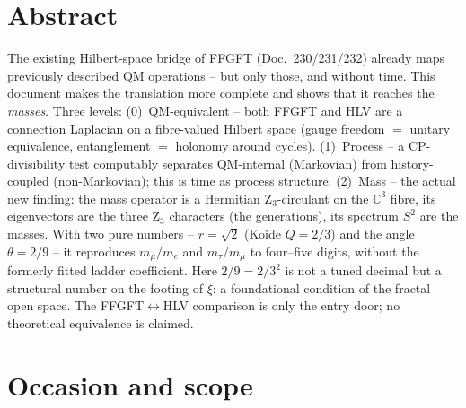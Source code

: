 
\section*{Abstract}
The existing Hilbert-space bridge of FFGFT (Doc.~230/231/232) already maps
previously described QM operations -- but only those, and without time. This
document makes the translation more complete and shows that it reaches the
\emph{masses}. Three levels: (0)~QM-equivalent -- both FFGFT and HLV are a
connection Laplacian on a fibre-valued Hilbert space (gauge freedom $=$ unitary
equivalence, entanglement $=$ holonomy around cycles). (1)~Process -- a
CP-divisibility test computably separates QM-internal (Markovian) from
history-coupled (non-Markovian); this is time as process structure.
(2)~Mass -- the actual new finding: the mass operator is a Hermitian
Z$_3$-circulant on the $\mathbb{C}^3$ fibre, its eigenvectors are the three
Z$_3$ characters (the generations), its spectrum $S^2$ are the masses. With two
pure numbers -- $r=\sqrt2$ (Koide $Q=2/3$) and the angle $\theta=2/9$ -- it
reproduces $m_\mu/m_e$ and $m_\tau/m_\mu$ to four--five digits, without the
formerly fitted ladder coefficient. Here $2/9=2/3^2$ is not a tuned decimal but
a structural number on the footing of $\xi$: a foundational condition of the
fractal open space. The FFGFT$\leftrightarrow$HLV comparison is only the entry
door; no theoretical equivalence is claimed.

\section{Occasion and scope}

